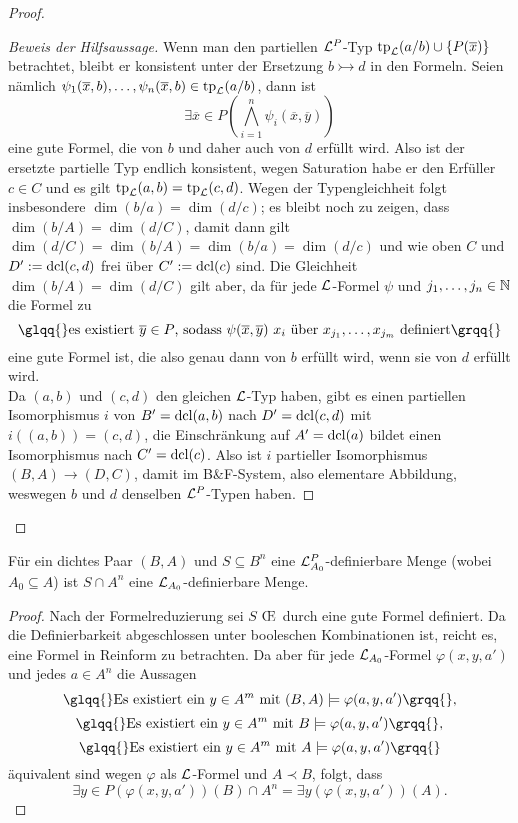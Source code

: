 \begin{proof}
\begin{proof}[Beweis der Hilfsaussage]
		Wenn man den partiellen $\mathcal{L}^P$-Typ $\operatorname{tp}_{\mathcal{L}}(a/b)\cup\{P(\overline{x})\}$ betrachtet, bleibt er konsistent unter der Ersetzung $b\rightarrowtail d$ in den Formeln. Seien nämlich $\psi_1(\overline{x},b),\dots,\psi_n(\overline{x},b)\in\operatorname{tp}_{\mathcal{L}}(a/b)$, dann ist $$\exists\overline{x}\in P(\bigwedge\limits_{i=1}^n\psi_i(\overline{x},\overline{y}))$$ eine gute Formel, die von $b$ und daher auch von $d$ erfüllt wird. Also ist der ersetzte partielle Typ endlich konsistent, wegen Saturation habe er den Erfüller $c\in C$ und es gilt $\operatorname{tp}_{\mathcal{L}}(a,b)=\operatorname{tp}_{\mathcal{L}}(c,d)$. Wegen der Typengleichheit folgt insbesondere $\dim(b/a)=\dim(d/c)$; es bleibt noch zu zeigen, dass $\dim(b/A)=\dim(d/C)$, damit dann gilt $\dim(d/C)=\dim(b/A)=\dim(b/a)=\dim(d/c)$ und wie oben $C$ und $D':=\operatorname{dcl}(c,d)$ frei über $C':=\operatorname{dcl}(c)$ sind. Die Gleichheit $\dim(b/A)=\dim(d/C)$ gilt aber, da für jede $\mathcal{L}$-Formel $\psi$ und $j_1,\dots,j_n\in\mathbb{N}$ die Formel zu $$\glqq{}\text{es existiert }\overline{y}\in P\text{, sodass }\psi(\overline{x},\overline{y})\ x_i\text{ über }x_{j_1},\dots,x_{j_m}\text{ definiert}\grqq{}$$ eine gute Formel ist, die also genau dann von $b$ erfüllt wird, wenn sie von $d$ erfüllt wird.\\
		Da $(a,b)$ und $(c,d)$ den gleichen $\mathcal{L}$-Typ haben, gibt es einen partiellen Isomorphismus $i$ von $B'=\operatorname{dcl}(a,b)$ nach $D'=\operatorname{dcl}(c,d)$ mit $i((a,b))=(c,d)$, die Einschränkung auf $A'=\operatorname{dcl}(a)$ bildet einen Isomorphismus nach $C'=\operatorname{dcl}(c)$. Also ist $i$ partieller Isomorphismus $(B,A)\rightarrow(D,C)$, damit im B\&F-System, also elementare Abbildung, weswegen $b$ und $d$ denselben $\mathcal{L}^P$-Typen haben.
	\end{proof}
\end{proof}

\begin{corollary}\label{Definierbarkeit aus A}
	Für ein dichtes Paar $(B,A)$ und $S\subseteq B^n$ eine $\mathcal{L}^P_{A_0}$-definierbare Menge (wobei $A_0\subseteq A$) ist $S\cap A^n$ eine $\mathcal{L}_{A_0}$-definierbare Menge.
\end{corollary}
\begin{proof}
	Nach der Formelreduzierung sei $S$ \OE\ durch eine gute Formel definiert. Da die Definierbarkeit abgeschlossen unter booleschen Kombinationen ist, reicht es, eine Formel in Reinform zu betrachten.\newpage
	Da aber für jede $\mathcal{L}_{A_0}$-Formel $\varphi(x,y,a')$ und jedes $a\in A^n$ die Aussagen $$\glqq{}\text{Es existiert ein }y\in A^m\text{ mit }(B,A)\models\varphi(a,y,a')\grqq{},$$ $$\glqq{}\text{Es existiert ein }y\in A^m\text{ mit }B\models\varphi(a,y,a')\grqq{},$$ $$\glqq{}\text{Es existiert ein }y\in A^m\text{ mit }A\models\varphi(a,y,a')\grqq{}$$ äquivalent sind wegen $\varphi$ als $\mathcal{L}$-Formel und $A\prec B$, folgt, dass $$\exists y\in P(\varphi(x,y,a'))(B)\cap A^n=\exists y(\varphi(x,y,a'))(A).$$
\end{proof}

